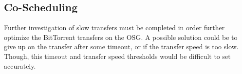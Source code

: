 \subsection{Co-Scheduling}





Further investigation of slow transfers must be completed in order further optimize the BitTorrent transfers on the OSG.  A possible solution could be to give up on the transfer after some timeout, or if the transfer speed is too slow.  Though, this timeout and transfer speed thresholds would be difficult to set accurately.

